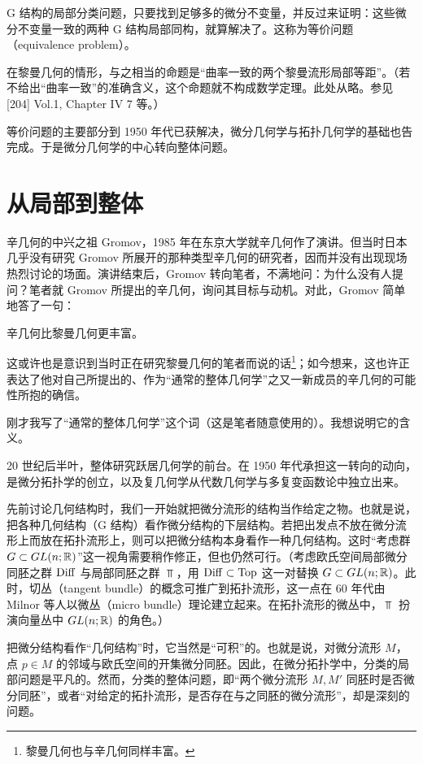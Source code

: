 G 结构的局部分类问题，只要找到足够多的微分不变量，并反过来证明：这些微分不变量一致的两种 G 结构局部同构，就算解决了。这称为等价问题（equivalence problem）。

在黎曼几何的情形，与之相当的命题是“曲率一致的两个黎曼流形局部等距”。（若不给出“曲率一致”的准确含义，这个命题就不构成数学定理。此处从略。参见 [204] Vol.1, Chapter IV 7 等。）

等价问题的主要部分到 1950 年代已获解决，微分几何学与拓扑几何学的基础也告完成。于是微分几何学的中心转向整体问题。

\section{从局部到整体}

辛几何的中兴之祖 Gromov，1985 年在东京大学就辛几何作了演讲。但当时日本几乎没有研究 Gromov 所展开的那种类型辛几何的研究者，因而并没有出现现场热烈讨论的场面。演讲结束后，Gromov 转向笔者，不满地问：为什么没有人提问？笔者就 Gromov 所提出的辛几何，询问其目标与动机。对此，Gromov 简单地答了一句：

辛几何比黎曼几何更丰富。

这或许也是意识到当时正在研究黎曼几何的笔者而说的话\footnote{黎曼几何也与辛几何同样丰富。}；如今想来，这也许正表达了他对自己所提出的、作为“通常的整体几何学”之又一新成员的辛几何的可能性所抱的确信。


刚才我写了“通常的整体几何学”这个词（这是笔者随意使用的）。我想说明它的含义。

20 世纪后半叶，整体研究跃居几何学的前台。在 1950 年代承担这一转向的动向，是微分拓扑学的创立，以及复几何学从代数几何学与多复变函数论中独立出来。

先前讨论几何结构时，我们一开始就把微分流形的结构当作给定之物。也就是说，把各种几何结构（G 结构）看作微分结构的下层结构。若把出发点不放在微分流形上而放在拓扑流形上，则可以把微分结构本身看作一种几何结构。这时“考虑群 $G\subset GL(n;\mathbb{R})$”这一视角需要稍作修正，但也仍然可行。（考虑欧氏空间局部微分同胚之群 $\operatorname{Diff}$ 与局部同胚之群 $\Top$，用 $\operatorname{Diff}\subset\operatorname{Top}$ 这一对替换 $G\subset GL(n;\mathbb{R})$。此时，切丛（tangent bundle）的概念可推广到拓扑流形，这一点在 60 年代由 Milnor 等人以微丛（micro bundle）理论建立起来。在拓扑流形的微丛中，$\Top$ 扮演向量丛中 $GL(n;\mathbb{R})$ 的角色。）

把微分结构看作“几何结构”时，它当然是“可积”的。也就是说，对微分流形 $M$，点 $p\in M$ 的邻域与欧氏空间的开集微分同胚。因此，在微分拓扑学中，分类的局部问题是平凡的。然而，分类的整体问题，即“两个微分流形 $M,M'$ 同胚时是否微分同胚”，或者“对给定的拓扑流形，是否存在与之同胚的微分流形”，却是深刻的问题。

